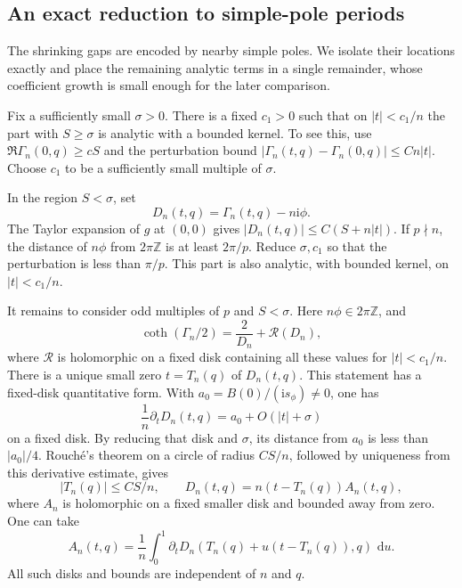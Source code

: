 \documentclass[11pt]{article}
\numberwithin{equation}{section}
\theoremstyle{definition}
\newcommand{\Z}{\mathbb Z}
\newcommand{\ii}{\mathrm i}
\newcommand{\dd}{\,\mathrm d}
\begin{document}
\subsection{An exact reduction to simple-pole periods}
\label{neg:pole-reduction}

The shrinking gaps are encoded by nearby simple poles. We isolate
their locations exactly and place the remaining analytic terms in a
single remainder, whose coefficient growth is small enough for the
later comparison.

Fix a sufficiently small \(\sigma>0\).  There is a fixed \(c_1>0\)
such that on \(|t|<c_1/n\) the part with \(S\ge\sigma\) is analytic
with a bounded kernel.  To see this, use
\(\Re\Gamma_n(0,q)\ge cS\) and the perturbation bound
\(|\Gamma_n(t,q)-\Gamma_n(0,q)|\le Cn|t|\).
Choose \(c_1\) to be a sufficiently small multiple of \(\sigma\).

In the region \(S<\sigma\), set
\[
 D_n(t,q)=\Gamma_n(t,q)-n\ii\phi .
 \]
The Taylor expansion of \(g\) at \((0,0)\) gives
\(|D_n(t,q)|\le C(S+n|t|)\).
If \(p\nmid n\), the distance of \(n\phi\) from \(2\pi\Z\) is at
least \(2\pi/p\).  Reduce \(\sigma,c_1\) so that the perturbation
is less than \(\pi/p\).  This part is also analytic, with bounded
kernel, on \(|t|<c_1/n\).

It remains to consider odd multiples of \(p\) and \(S<\sigma\).
Here \(n\phi\in2\pi\Z\), and
\[
 \coth(\Gamma_n/2)=\frac2{D_n}+\mathcal R(D_n),
 \]
where \(\mathcal R\) is holomorphic on a fixed disk containing all
these values for \(|t|<c_1/n\).
There is a unique small zero \(t=T_n(q)\) of \(D_n(t,q)\).
This statement has a fixed-disk quantitative form.  With
\(a_0=B(0)/(\ii s_\phi)\ne0\), one has
\[
 \frac1n\partial_tD_n(t,q)=a_0+O(|t|+\sigma)
 \]
on a fixed disk.  By reducing that disk and \(\sigma\), its
distance from \(a_0\) is less than \(|a_0|/4\).  Rouch\'e's
theorem on a circle of radius \(CS/n\), followed by uniqueness
from this derivative estimate, gives
\begin{equation}
 |T_n(q)|\le CS/n,\qquad
 D_n(t,q)=n(t-T_n(q))A_n(t,q),
 \label{neg:pole-factor}
\end{equation}
where \(A_n\) is holomorphic on a fixed smaller disk and bounded
away from zero.  One can take
\[
 A_n(t,q)=\frac1n\int_0^1
   \partial_tD_n(T_n(q)+u(t-T_n(q)),q)\,\dd u .
 \]
All such disks and bounds are independent of \(n\) and \(q\).
\end{document}
